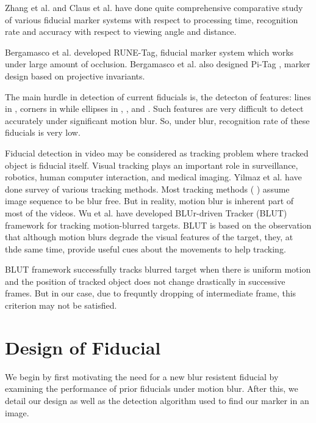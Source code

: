 \documentclass[runningheads]{llncs}
\begin{document}
Zhang et al.\cite{Zhang:2002} and Claus et al. \cite{ClausF04} have done
quite comprehensive comparative study of various fiducial marker systems with
respect to processing time, recognition rate and accuracy with
respect to viewing angle and distance.

Bergamasco et al. \cite{runetag11} developed RUNE-Tag, fiducial marker
system which works under large amount of occlusion. Bergamasco et al. also
designed Pi-Tag \cite{Pitag13}, marker design based on projective
invariants.

The main hurdle in detection of current fiducials is, the detecton of features:
lines in \cite{ARToolkit02}, corners in \cite{Fiala05} while ellipses in
\cite{Cho:2001}, \cite{Cho97fastcolor}, \cite{runetag11} and \cite{Pitag13}.
Such features are very difficult to detect accurately under significant motion
blur. So, under blur, recognition rate of these fiducials is very low.

Fiducial detection in video may be considered as tracking problem where tracked
object is fiducial itself. Visual tracking plays an important role in
surveillance, robotics, human computer interaction, and medical
imaging\cite{Yilmaz:2006}. Yilmaz et al.\cite{Yilmaz:2006} have done survey of
various tracking methods. Most tracking methods
( \cite{Ross:2008} \cite{Wu:2009} \cite{Perez02} \cite{Mei:2009} ) assume image
sequence to be blur free. But in reality, motion blur is inherent part of most
of the videos. Wu et al.\cite{Wu:2011} have developed BLUr-driven Tracker (BLUT)
framework for tracking motion-blurred targets. BLUT is based on the observation
that although motion blurs degrade the visual features of the target, they, at
thde same time, provide useful cues about the movements to help tracking.

BLUT framework successfully tracks blurred target when there is uniform motion
and the position of tracked object does not change drastically in successive
frames. But in our case, due to frequntly dropping of intermediate frame, this
criterion may not be satisfied.

\section{Design of Fiducial}

We begin by first motivating the need for a new blur resistent fiducial by examining
the performance of prior fiducials under motion blur.  After this, we detail
our design as well as the detection algorithm used to find our marker in an image.
\end{document}
